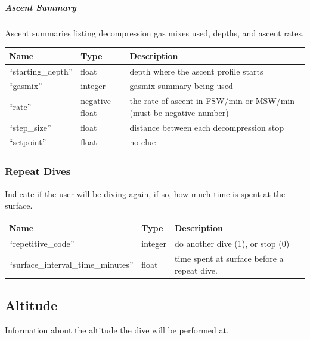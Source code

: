\documentclass[12pt]{article}
\begin{document}
\subparagraph{Ascent Summary}
Ascent summaries listing decompression gas mixes used, depths, and ascent rates.

\begin{longtable}{|l|l|p{5cm}|}
\hline
 Name                 &  Type            &  Description                                                         \\
\hline
 ``starting\_depth''  &  float           &  depth where the ascent profile starts                               \\
\hline
 ``gasmix''           &  integer         &  gasmix summary being used                                           \\
\hline
 ``rate''             &  negative float  &  the rate of ascent in FSW/min or MSW/min (must be negative number)  \\
\hline
 ``step\_size''       &  float           &  distance between each decompression stop                            \\
\hline
 ``setpoint''         &  float           &  no clue                                                             \\
\hline
\end{longtable}

\subsubsection{Repeat Dives}
Indicate if the user will be diving again, if so, how much time is spent at the surface.

\begin{longtable}{|l|l|p{5cm}|}

\hline
 Name                                   &  Type    &  Description \\                                                         \hline
 ``repetitive\_code''                  &  integer  &  do another dive (1), or stop (0)             \\
\hline
 ``surface\_interval\_time\_minutes''  &  float    &  time spent at surface before a repeat dive.  \\
\hline
\end{longtable}

\subsection{Altitude}
Information about the altitude the dive will be performed at.
\end{document}
